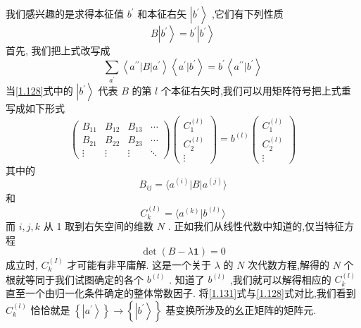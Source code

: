 \documentclass[lang=cn,newtx,10pt,scheme=chinese,thmcnt=section]{elegantbook}
\begin{document}
我们感兴趣的是求得本征值 ${b}^{\prime }$ 和本征右矢 $\left| {b}^{\prime }\right\rangle$ ,它们有下列性质
\begin{equation}\label{1.128}
	B\left| {b}^{\prime }\right\rangle = {b}^{\prime }\left| {b}^{\prime }\right\rangle
\end{equation}
首先, 我们把上式改写成
\begin{equation}
	\mathop{\sum }\limits_{{a}^{\prime }}\left\langle {{a}^{\prime \prime }\left| B\right| {a}^{\prime }}\right\rangle \left\langle {{a}^{\prime } | {b}^{\prime }}\right\rangle = {b}^{\prime }\left\langle {{a}^{\prime \prime } | {b}^{\prime }}\right\rangle
\end{equation}
当\ref{1.128}式中的 $\left| {b}^{\prime }\right\rangle$ 代表 $B$ 的第 $l$ 个本征右矢时,我们可以用矩阵符号把上式重写成如下形式
\begin{equation}
	\left( \begin{matrix} {B}_{11} & {B}_{12} & {B}_{13} & \cdots \\ {B}_{21} & {B}_{22} & {B}_{23} & \cdots \\ \vdots & \vdots & \vdots & \ddots \end{matrix}\right) \left( \begin{matrix} {C}_{1}^{\left( l\right) } \\ {C}_{2}^{\left( l\right) } \\ \vdots \end{matrix}\right) = {b}^{\left( l\right) }\left( \begin{matrix} {C}_{1}^{\left( l\right) } \\ {C}_{2}^{\left( l\right) } \\ \vdots \end{matrix}\right)
\end{equation}
其中的
\begin{equation}\label{1.131}
	{B}_{ij} = \langle {{a}^{\left( i\right) }\left| B\right| {a}^{\left( j\right) }}\rangle
\end{equation}
和
\begin{equation}
	{C}_{k}^{\left( l\right) } = \langle {{a}^{\left( k\right) } | {b}^{\left( l\right) }}\rangle
\end{equation}
而 $i, j, k$ 从 1 取到右矢空间的维数 $N$ . 正如我们从线性代数中知道的,仅当特征方程
\begin{equation}
	\det \left( {B - {\lambda \textbf{1}}}\right) = 0
\end{equation}
成立时, ${C}_{k}^{\left( I\right) }$ 才可能有非平庸解. 这是一个关于 $\lambda$ 的 $N$ 次代数方程,解得的 $N$ 个根就等同于我们试图确定的各个 ${b}^{\left( l\right) }$ . 知道了 ${b}^{\left( l\right) }$ ,我们就可以解得相应的 ${C}_{k}^{\left( l\right) }$ 直至一个由归一化条件确定的整体常数因子. 将\ref{1.131}式与\ref{1.128}式对比,我们看到 ${C}_{k}^{\left( l\right) }$ 恰恰就是 $\left\{ \left| {a}^{\prime }\right\rangle \right\} \rightarrow \left\{ \left| {b}^{\prime }\right\rangle \right\}$ 基变换所涉及的幺正矩阵的矩阵元.
\end{document}
